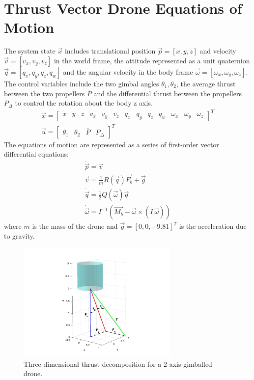 \documentclass[]{article}
\newcommand{\pdiff}{P_{\Delta}}
\newcommand{\pavg}{\overline{P}}
\begin{document}
	

	
\section*{Thrust Vector Drone Equations of Motion}
	
The system state $\vec{x}$ includes translational position $\vec{p} = [x, y,  z]$ and velocity $\vec{v} = [v_x, v_y, v_z ]$  in the world frame, the attitude represented as a unit quaternion $\vec{q} = [q_x, q_y,  q_z, q_w]$ and the angular velocity in the body frame $ \vec{\omega} = [\omega_x, \omega_y, \omega_z]$. The control variables include the two gimbal angles $\theta_1, \theta_2 $, the average thrust between the two propellers $\pavg$ and the differential thrust between the propellers $\pdiff$ to control the rotation about the body z axis.
\begin{gather*}
	\vec{x} =
	\begin{bmatrix}
		x & y & z & v_x & v_y & v_z & q_x & q_y & q_z & q_w & \omega_x & \omega_y & \omega_z
	\end{bmatrix}^T \\
	        \vec{u} =
	        \begin{bmatrix}
		        \theta_1 & \theta_2 & \pavg & \pdiff
		        \end{bmatrix}^T
\end{gather*}
The equations of motion are represented as a series of first-order vector differential equations:
\begin{gather}
        	\dot{\vec{p}}  = \vec{v}         \label{eqMotion1}	\\
        	\dot{\vec{v}}  = \frac{1}{m}R(\vec{q})\vec{F_b}+\vec{g}  \label{eqMotion2} \\
        	\dot{\vec{q}} = \frac{1}{2}Q(\vec{\omega})\vec{q}  \label{eqMotion3} \\
        	\dot{\vec{\omega}} = I^{-1}\!\left(\vec{M_b} - \vec{\omega} \times (I\,\vec{\omega})\right) \label{eqMotion4}
\end{gather}
where $m$ is the mass of the drone and $\vec{g} = [0, 0, -9.81]^T$ is the acceleration due to gravity.
\begin{figure}[H]
	\centering
	\includegraphics[width=0.7\textwidth]{figures/graph3d.jpg}
	\caption{Three-dimensional thrust decomposition for a 2-axis gimballed drone.}
	\label{fig:3dgraph}
\end{figure}
\end{document}
